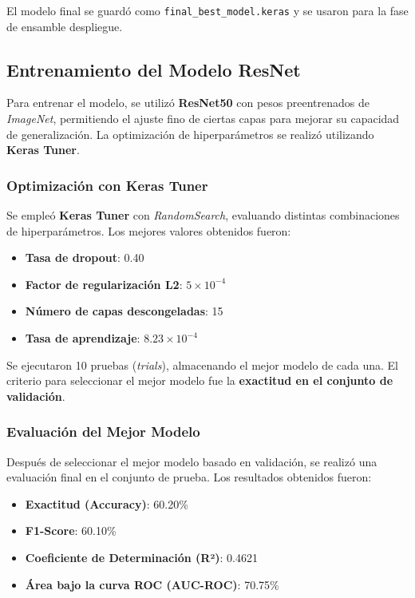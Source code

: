 El modelo final se guardó como \texttt{final\_best\_model.keras} y se usaron para
la fase de ensamble despliegue.

\subsection{Entrenamiento del Modelo ResNet}

Para entrenar el modelo, se utilizó \textbf{ResNet50} con pesos preentrenados de
\textit{ImageNet}, permitiendo el ajuste fino de ciertas capas para mejorar su
capacidad de generalización. La optimización de hiperparámetros se realizó
utilizando \textbf{Keras Tuner}.

\subsubsection{Optimización con Keras Tuner}
Se empleó \textbf{Keras Tuner} con \textit{RandomSearch}, evaluando distintas
combinaciones de hiperparámetros. Los mejores valores obtenidos fueron:

\begin{itemize}
    \item \textbf{Tasa de dropout}: 0.40
    \item \textbf{Factor de regularización L2}: $5 \times 10^{-4}$
    \item \textbf{Número de capas descongeladas}: 15
    \item \textbf{Tasa de aprendizaje}: $8.23 \times 10^{-4}$
\end{itemize}

Se ejecutaron 10 pruebas (\textit{trials}), almacenando el mejor modelo de cada una.
El criterio para seleccionar el mejor modelo fue la \textbf{exactitud en el conjunto de
validación}.

\subsubsection{Evaluación del Mejor Modelo}

Después de seleccionar el mejor modelo basado en validación, se realizó una evaluación final en el conjunto de prueba.
Los resultados obtenidos fueron:

\begin{itemize}
    \item \textbf{Exactitud (Accuracy)}: 60.20\%
    \item \textbf{F1-Score}: 60.10\%
    \item \textbf{Coeficiente de Determinación (R²)}: 0.4621
    \item \textbf{Área bajo la curva ROC (AUC-ROC)}: 70.75\%
\end{itemize}

